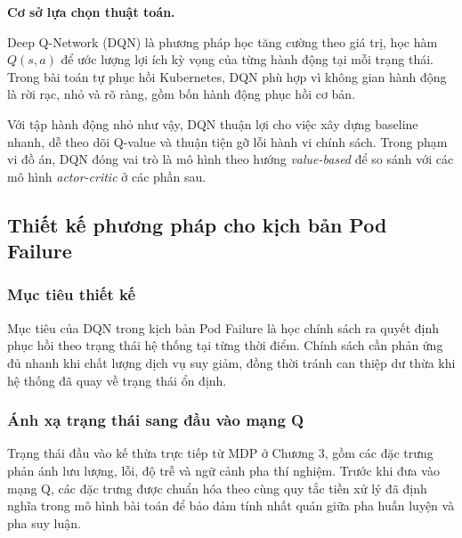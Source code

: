 \noindent \textbf{Cơ sở lựa chọn thuật toán.}

\noindent Deep Q-Network (DQN) là phương pháp học tăng cường theo giá trị, học hàm $Q(s,a)$ để ước lượng lợi ích kỳ vọng của từng hành động tại mỗi trạng thái. Trong bài toán tự phục hồi Kubernetes, DQN phù hợp vì không gian hành động là rời rạc, nhỏ và rõ ràng, gồm bốn hành động phục hồi cơ bản.

\noindent Với tập hành động nhỏ như vậy, DQN thuận lợi cho việc xây dựng baseline nhanh, dễ theo dõi Q-value và thuận tiện gỡ lỗi hành vi chính sách. Trong phạm vi đồ án, DQN đóng vai trò là mô hình theo hướng \textit{value-based} để so sánh với các mô hình \textit{actor-critic} ở các phần sau.

\subsection{Thiết kế phương pháp cho kịch bản Pod Failure}

\subsubsection{Mục tiêu thiết kế}

\noindent Mục tiêu của DQN trong kịch bản Pod Failure là học chính sách ra quyết định phục hồi theo trạng thái hệ thống tại từng thời điểm. Chính sách cần phản ứng đủ nhanh khi chất lượng dịch vụ suy giảm, đồng thời tránh can thiệp dư thừa khi hệ thống đã quay về trạng thái ổn định.

\subsubsection{Ánh xạ trạng thái sang đầu vào mạng Q}

\noindent Trạng thái đầu vào kế thừa trực tiếp từ MDP ở Chương 3, gồm các đặc trưng phản ánh lưu lượng, lỗi, độ trễ và ngữ cảnh pha thí nghiệm. Trước khi đưa vào mạng Q, các đặc trưng được chuẩn hóa theo cùng quy tắc tiền xử lý đã định nghĩa trong mô hình bài toán để bảo đảm tính nhất quán giữa pha huấn luyện và pha suy luận.


